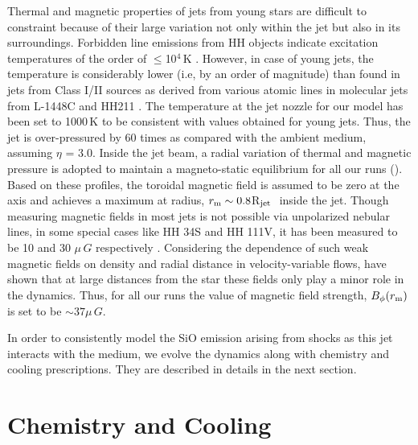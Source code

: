 \documentclass[useAMS,usenatbib]{mn2e}
\newcommand{\rj}{R$_{\rm jet}$}
\begin{document}
Thermal and magnetic properties of jets from young stars are difficult
to constraint because of their large variation not only within the jet
but also in its surroundings. Forbidden line emissions from
HH objects indicate excitation temperatures of the order
of $\leq$10$^{4}$\,K \citep{Podio:2006p15921,
  Bally:2007p2340}. However, in case of 
young jets, the temperature is
considerably lower (i.e, by an order of magnitude) than found in jets from Class I/II
sources as derived from various atomic lines in molecular jets from
L-1448C and HH211 \citep{Dionatos:2009p15670,Dionatos:2010p15968}.  
The temperature at the jet
nozzle for our model has been set to 1000\,K to be consistent with values obtained for young jets. 
Thus, the jet is over-pressured by 60 times as compared with the ambient medium,
assuming $\eta$ = 3.0. Inside the jet beam, a radial variation of thermal
and magnetic pressure is adopted to maintain a magneto-static
equilibrium for all our runs (\citealt{Stone:2000p2650}). 
Based on these profiles, 
the toroidal magnetic field is assumed to be
zero at the axis and achieves a maximum at radius, $r_{\rm m} \sim 0.8$\rj\,\,
inside the jet. Though measuring magnetic fields in
most jets is not possible via unpolarized nebular lines, in some special
cases like HH 34S and HH 111V, it has been measured to be 10 and 30
$\mu\,G$ respectively \citep{Morse:1993p15960}. Considering the
dependence of such weak magnetic fields on density and radial distance in velocity-variable flows, 
\cite{Hartigan:2007p15768} have shown that at large distances from the 
star these fields only play a minor role in the dynamics. Thus, for all
our runs the value of magnetic field strength, $B_{\phi}(r_{\rm m})$ 
is set to be $\sim 37\mu\,G$.
%

In order to consistently model the SiO emission arising from shocks as
this jet interacts with the medium, we evolve the dynamics along with
chemistry and cooling prescriptions. They are described in details in
the next section.

\section{Chemistry and Cooling}
\label{sec:chem}
\end{document}
